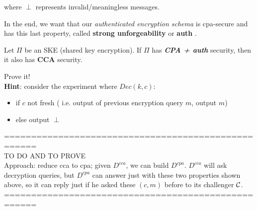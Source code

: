 where $\perp$ represents invalid/meaningless messages.

In the end, we want that our \textit{authenticated encryption schema} is
cpa-secure and has this last property, called \textbf{strong unforgeability} or
\textbf{auth} . 

\begin{theorem}
    Let $\Pi$ be an SKE (shared key encryption). If $\Pi$ has \textbf{
    \textit{CPA + auth} } security, then it also has \textbf{CCA} security.
\end{theorem}

\begin{exercise}
    Prove it!\\
    \textbf{Hint}: consider the experiment where $Dec(k, c)$:
    \begin{itemize}
        \item if $c$ not fresh ( i.e. output of previous encryption query $m$,
            output $m$)
        \item else output $\perp$
    \end{itemize}
    
    ====================================================\\
    TO DO AND TO PROVE\\
    Approach: reduce cca to cpa; given $D^{cca}$, we can build $D^{cpa}$.
    $D^{cca}$ will ask decryption queries, but $D^{cpa}$ can answer just with
    these two properties shown above, so it can reply just if he asked these
    $(c, m)$ before to its challenger $\mathcal{C}$.
    ====================================================\\
\end{exercise}

